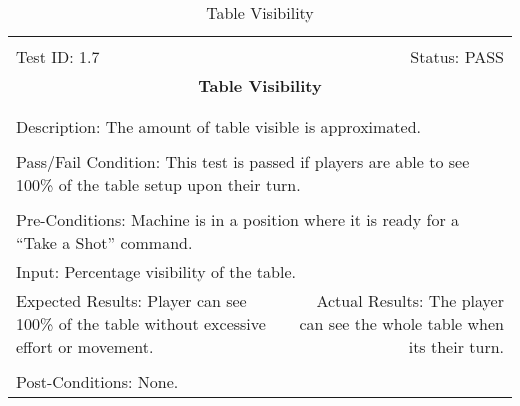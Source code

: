 \documentclass[titlepage]{article}
\begin{document}
\begin{center}
\begin{table}[h!]
\begin{tabular}{|l r|}\hline&\\[-2mm]
	Test ID: 1.7	&Status: PASS\\[-3mm]
	\multicolumn{2}{|c|}{\textbf{\large{Table Visibility}}}\\&\\\hline&\\[-3mm]
	\multicolumn{2}{|p{\textwidth}|}{Description: The amount of table visible is approximated.}\\[1mm]\hline&\\[-3mm]
	\multicolumn{2}{|p{\textwidth}|}{Pass/Fail Condition: This test is passed if players are able to see 100\% of the table setup upon their turn.}\\[1mm]\hline&\\[-3mm]
	\multicolumn{2}{|p{\textwidth}|}{Pre-Conditions: Machine is in a position where it is ready for a ``Take a Shot'' command.}\\[4mm]
	\multicolumn{2}{|p{\textwidth}|}{Input: Percentage visibility of the table.}\\[2mm]\hline
	\multicolumn{1}{|p{0.49\textwidth}}{Expected Results: Player can see 100\% of the table without excessive effort or movement.}	&\multicolumn{1}{|p{0.45\textwidth}|}{Actual Results: The player can see the whole table when its their turn.}\\\hline&\\[-3mm]
	\multicolumn{2}{|p{\textwidth}|}{Post-Conditions: None.}\\\hline
\end{tabular}
\caption{Table Visibility}
\end{table}
\end{center}
\end{document}
